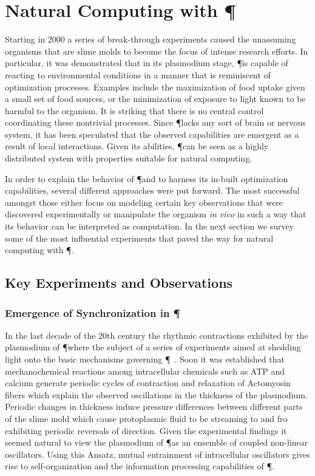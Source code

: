 
\section{Natural Computing with \P}\label{sec:natural_computing_physarum}

	Starting in 2000 a series of break-through experiments caused the unassuming organisms that are slime molds to become the focus of intense research efforts. In particular, it was demonstrated that in its plasmodium stage, \P is capable of reacting to environmental conditions in a manner that is reminiscent of optimization processes. Examples include the maximization of food uptake given a small set of food sources, or the minimization of exposure to light known to be harmful to the organism. It is striking that there is no central control coordinating these nontrivial processes. Since \P lacks any sort of brain or nervous system, it has been speculated that the observed capabilities are emergent as a result of local interactions. Given its abilities, \P can be seen as a highly distributed system with properties suitable for natural computing.

	In order to explain the behavior of \P and to harness its in-built optimization capabilities, several different approaches were put forward. The most successful amongst those either focus on modeling certain key observations that were discovered experimentally or manipulate the organism \textit{in vivo} in such a way that its behavior can be interpreted as computation. In the next section we survey some of the most influential experiments that paved the way for natural computing with \P.

	\subsection{Key Experiments and Observations}

		\subsubsection{Emergence of Synchronization in \P }
		
			In the last decade of the 20th century the rhythmic contractions exhibited by the plasmodium of \P where the subject of a series of experiments aimed at shedding light onto the basic mechanisms governing \P~\cite{MIYAKE1996341,NAKAGAKI1996261,TAKAHASHI1997105}. Soon it was established that mechanochemical reactions among intracellular chemicals such as ATP and calcium generate periodic cycles of contraction and relaxation of Actomyosin fibers which explain the observed oscillations in the thickness of the plasmodium. Periodic changes in thickness induce pressure differences between different parts of the slime mold which cause protoplasmic fluid to be streaming to and fro exhibiting periodic reversals of direction. Given the experimental findings it seemed natural to view the plasmodium of \P as an ensemble of coupled non-linear oscillators. Using this Ansatz, mutual entrainment of intracellular oscillators gives rise to self-organization and the information processing capabilities of \P. 

